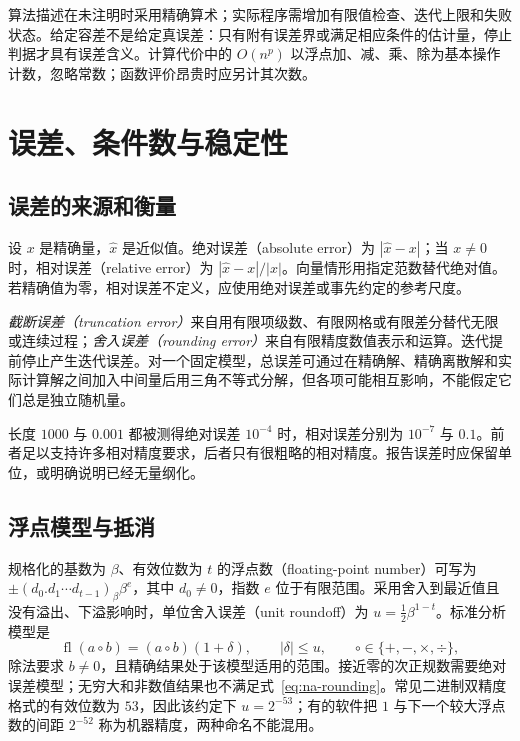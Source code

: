 \documentclass[UTF8,12pt,a4paper,fontset=fandol]{ctexbook}
\begin{document}
算法描述在未注明时采用精确算术；实际程序需增加有限值检查、迭代上限和失败状态。给定容差不是给定真误差：只有附有误差界或满足相应条件的估计量，停止判据才具有误差含义。计算代价中的 $O(n^p)$ 以浮点加、减、乘、除为基本操作计数，忽略常数；函数评价昂贵时应另计其次数。

\chapter{误差、条件数与稳定性}
\label{chap:na-errors}

\section{误差的来源和衡量}
\begin{definition}[绝对误差与相对误差]
设 $x$ 是精确量，$\widehat x$ 是近似值。绝对误差（absolute error）为 $|\widehat x-x|$；当 $x\ne0$ 时，相对误差（relative error）为 $|\widehat x-x|/|x|$。向量情形用指定范数替代绝对值。若精确值为零，相对误差不定义，应使用绝对误差或事先约定的参考尺度。
\end{definition}

\emph{截断误差（truncation error）}来自用有限项级数、有限网格或有限差分替代无限或连续过程；\emph{舍入误差（rounding error）}来自有限精度数值表示和运算。迭代提前停止产生迭代误差。对一个固定模型，总误差可通过在精确解、精确离散解和实际计算解之间加入中间量后用三角不等式分解，但各项可能相互影响，不能假定它们总是独立随机量。

\begin{example}[相同绝对误差的不同含义]
长度 $1000$ 与 $0.001$ 都被测得绝对误差 $10^{-4}$ 时，相对误差分别为 $10^{-7}$ 与 $0.1$。前者足以支持许多相对精度要求，后者只有很粗略的相对精度。报告误差时应保留单位，或明确说明已经无量纲化。
\end{example}

\section{浮点模型与抵消}
\label{sec:na-floating}
规格化的基数为 $\beta$、有效位数为 $t$ 的浮点数（floating-point number）可写为 $\pm(d_0.d_1\cdots d_{t-1})_\beta\beta^e$，其中 $d_0\ne0$，指数 $e$ 位于有限范围。采用舍入到最近值且没有溢出、下溢影响时，单位舍入误差（unit roundoff）为 $u=\tfrac12\beta^{1-t}$。标准分析模型是
\begin{equation}
 \operatorname{fl}(a\circ b)=(a\circ b)(1+\delta),
 \qquad |\delta|\le u,\qquad \circ\in\{+,-,\times,\div\},
 \label{eq:na-rounding}
\end{equation}
除法要求 $b\ne0$，且精确结果处于该模型适用的范围。接近零的次正规数需要绝对误差模型；无穷大和非数值结果也不满足式~\eqref{eq:na-rounding}。常见二进制双精度格式的有效位数为 $53$，因此该约定下 $u=2^{-53}$；有的软件把 $1$ 与下一个较大浮点数的间距 $2^{-52}$ 称为机器精度，两种命名不能混用。
\end{document}
